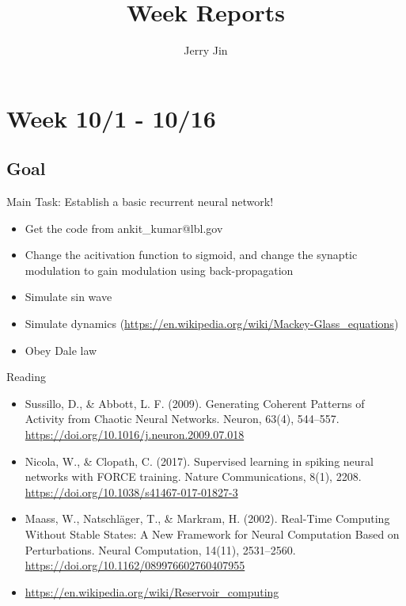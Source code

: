 \documentclass[12pt, a4paper]{article}
\title{Week Reports}
\author{Jerry Jin}
\begin{document}
\maketitle

\section*{Week 10/1 - 10/16}

\subsection*{Goal}

\noindent
Main Task: Establish a basic recurrent neural network!

\begin{itemize}
    \item Get the code from ankit\_kumar@lbl.gov
    \item Change the acitivation function to sigmoid, and change the synaptic modulation to gain modulation using back-propagation
    \item Simulate sin wave
    \item Simulate dynamics (\url{https://en.wikipedia.org/wiki/Mackey-Glass_equations})
    \item Obey Dale law
\end{itemize}

\noindent
Reading

\begin{itemize}
    \item Sussillo, D., \& Abbott, L. F. (2009). Generating Coherent Patterns of Activity from Chaotic Neural Networks. Neuron, 63(4), 544–557. \url{https://doi.org/10.1016/j.neuron.2009.07.018}
    \item Nicola, W., \& Clopath, C. (2017). Supervised learning in spiking neural networks with FORCE training. Nature Communications, 8(1), 2208. \url{https://doi.org/10.1038/s41467-017-01827-3}
    \item Maass, W., Natschläger, T., \& Markram, H. (2002). Real-Time Computing Without Stable States: A New Framework for Neural Computation Based on Perturbations. Neural Computation, 14(11), 2531–2560. \url{https://doi.org/10.1162/089976602760407955}
    \item \url{https://en.wikipedia.org/wiki/Reservoir_computing}
\end{itemize}

\newpage
\end{document}
